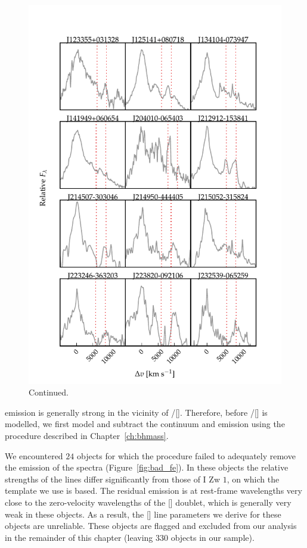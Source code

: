 \begin{figure}
\ContinuedFloat
    \centering
    \includegraphics[width=\columnwidth]{figures/chapter04/example_spectrum_grid_extreme_fe_2.pdf} 
    \caption[]{Continued.}     
\end{figure}


 emission is generally strong in the vicinity of \hbns/[]. 
Therefore, before \hbns/[] is modelled, we first model and subtract the continuum and  emission using the procedure described in Chapter~\ref{ch:bhmass}. 

We encountered $24$ objects for which the procedure failed to adequately remove the  emission of the spectra (Figure~\ref{fig:bad_fe}).  
In these objects the relative strengths of the  lines differ significantly from those of I Zw $1$, on which the \citet{boroson92}  template we use is based. 
The residual  emission is at rest-frame wavelengths very close to the zero-velocity wavelengths of the [] doublet, which is generally very weak in these objects. 
As a result, the [] line parameters we derive for these objects are unreliable. 
These objects are flagged and excluded from our analysis in the remainder of this chapter (leaving $330$ objects in our sample). 

